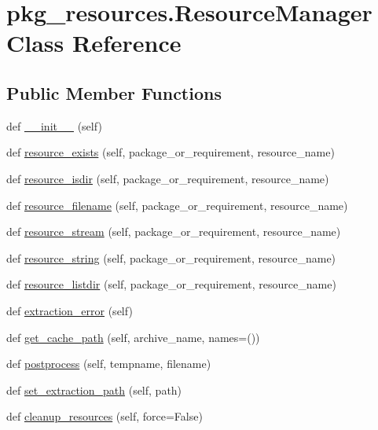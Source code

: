\hypertarget{classpkg__resources_1_1ResourceManager}{}\section{pkg\+\_\+resources.\+Resource\+Manager Class Reference}
\label{classpkg__resources_1_1ResourceManager}
\subsection*{Public Member Functions}
\begin{DoxyCompactItemize}
\item 
def \hyperlink{classpkg__resources_1_1ResourceManager_a9673742b6f33a0e9e50964d778d88147}{\+\_\+\+\_\+init\+\_\+\+\_\+} (self)
\item 
def \hyperlink{classpkg__resources_1_1ResourceManager_ad1b6e05f2dbd4022e832ce0fce52a49c}{resource\+\_\+exists} (self, package\+\_\+or\+\_\+requirement, resource\+\_\+name)
\item 
def \hyperlink{classpkg__resources_1_1ResourceManager_a32204e72f09b8a5f92e50d8ef1636bc6}{resource\+\_\+isdir} (self, package\+\_\+or\+\_\+requirement, resource\+\_\+name)
\item 
def \hyperlink{classpkg__resources_1_1ResourceManager_a6c85868c8de9cb637490e298ff1252c0}{resource\+\_\+filename} (self, package\+\_\+or\+\_\+requirement, resource\+\_\+name)
\item 
def \hyperlink{classpkg__resources_1_1ResourceManager_a8656d0d38efd4f2afe70595e001838fc}{resource\+\_\+stream} (self, package\+\_\+or\+\_\+requirement, resource\+\_\+name)
\item 
def \hyperlink{classpkg__resources_1_1ResourceManager_ae1e5f9bafec64d9271aea875f7d491bf}{resource\+\_\+string} (self, package\+\_\+or\+\_\+requirement, resource\+\_\+name)
\item 
def \hyperlink{classpkg__resources_1_1ResourceManager_aa613cb6baad8c9bdb748e6592536022d}{resource\+\_\+listdir} (self, package\+\_\+or\+\_\+requirement, resource\+\_\+name)
\item 
def \hyperlink{classpkg__resources_1_1ResourceManager_a39f27f35ad11069273856a00d26df314}{extraction\+\_\+error} (self)
\item 
def \hyperlink{classpkg__resources_1_1ResourceManager_a79de123f8cc5bf426ae33bd6b6b21e0c}{get\+\_\+cache\+\_\+path} (self, archive\+\_\+name, names=())
\item 
def \hyperlink{classpkg__resources_1_1ResourceManager_af459cd9904c680589c54e462b0e6cf4d}{postprocess} (self, tempname, filename)
\item 
def \hyperlink{classpkg__resources_1_1ResourceManager_aa07a3bbaed612c6837984c00c8d162eb}{set\+\_\+extraction\+\_\+path} (self, path)
\item 
def \hyperlink{classpkg__resources_1_1ResourceManager_a85ba051ec7d82f0803dd96e45df1d21d}{cleanup\+\_\+resources} (self, force=False)
\end{DoxyCompactItemize}

